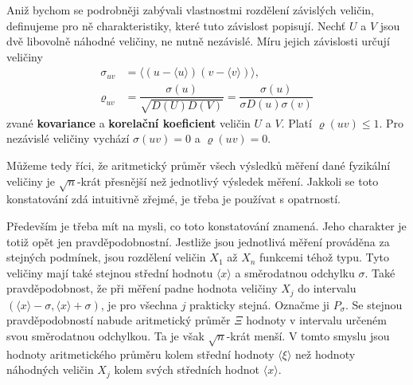       Aniž bychom se podrobněji zabývali vlastnostmi rozdělení závislých veličin, definujeme pro
      ně charakteristiky, které tuto závislost popisují. Nechť \(U\) a \(V\) jsou dvě libovolně 
      náhodné veličiny, ne nutně nezávislé. Míru jejich závislosti určují veličiny
      \begin{subequations}\label{mai:eq071}
        \begin{align}
          \sigma_{uv} 
            &= \langle (u - \langle u \rangle) (v - \langle v \rangle) \rangle,  \\
          \varrho_ {uv}
            &=\dfrac{\sigma(u)}{\sqrt{D(U)D(V)}} = \dfrac{\sigma(u)}{\sigma{D(u)\sigma(v)}}
        \end{align}
      \end{subequations}  
      zvané \textbf{kovariance} a \textbf{korelační koeficient} veličin \(U\) a \(V\). Platí 
      \(\varrho(uv) \leq 1\). Pro nezávislé veličiny vychází \(\sigma(uv) = 0\) a \(\varrho(uv) = 
      0\).
      
      
      
      
      
      Můžeme tedy říci, že aritmetický průměr všech výsledků měření dané fyzikální veličiny je
      \(\sqrt{n}\)-krát přesnější než jednotlivý výsledek měření. Jakkoli se toto konstatování zdá 
      intuitivně zřejmé, je třeba je používat s opatrností.
      
      Především je třeba mít na mysli, co toto konstatování znamená. Jeho charakter je totiž
      opět jen pravděpodobnostní. Jestliže jsou jednotlivá měření prováděna za stejných podmínek,
      jsou rozdělení veličin \(X_1\) až \(X_n\) funkcemi téhož typu. Tyto veličiny mají také 
      stejnou střední hodnotu \(\langle x \rangle\) a směrodatnou odchylku \(\sigma\). Také 
      pravděpodobnost, že při měření padne hodnota veličiny \(X_j\) do intervalu \((\langle x 
      \rangle - \sigma, \langle x \rangle + \sigma)\), je pro všechna \(j\) prakticky stejná. 
      Označme ji \(P_\sigma\).  Se stejnou pravděpodobností nabude aritmetický průměr \(\Xi\) 
      hodnoty v intervalu určeném svou směrodatnou odchylkou. Ta je však \(\sqrt{n}\)-krát menší. V 
      tomto smyslu jsou hodnoty aritmetického průměru  kolem 
      střední hodnoty \(\langle\xi \rangle\) než hodnoty náhodných veličin \(X_j\) kolem svých 
      středních hodnot \(\langle x \rangle\).
      

